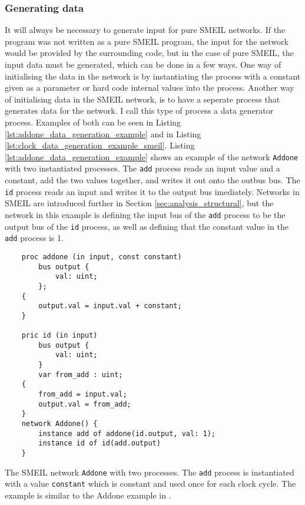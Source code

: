 \subsubsection{Generating data}
It will always be necessary to generate input for pure SMEIL networks. If the program was not written as a pure SMEIL program, the input for the network would be provided by the surrounding code, but in the case of pure SMEIL, the input data must be generated, which can be done in a few ways.
One way of initialising the data in the network is by instantiating the process with a constant given as a parameter or hard code internal values into the process. Another way of initialising data in the SMEIL network, is to have a seperate process that generates data for the network. I call this type of process a data generator process. Examples of both can be seen in Listing \ref{lst:addone_data_generation_example} and in Listing \ref{lst:clock_data_generation_example_smeil}.
Listing \ref{lst:addone_data_generation_example} shows an example of the network \texttt{Addone} with two instantiated processes. The \texttt{add} process reads an input value and a constant, add the two values together, and writes it out onto the outbus bus. The \texttt{id} process reads an input and writes it to the output bus imediately. Networks in SMEIL are introduced further in Section \ref{sec:analysis_structural}, but the network in this example is defining the input bus of the \texttt{add} process to be the output bus of the \texttt{id} process, as well as defining that the constant value in the \texttt{add} process is 1. \\
\begin{listing}
    \begin{verbatim}
    proc addone (in input, const constant)
        bus output {
            val: uint;
        };
    {
        output.val = input.val + constant;
    }

    pric id (in input)
        bus output {
            val: uint;
        }
        var from_add : uint;
    {
        from_add = input.val;
        output.val = from_add;
    }
    network Addone() {
        instance add of addone(id.output, val: 1);
        instance id of id(add.output)
    }
    \end{verbatim}
    \caption{The SMEIL network \texttt{Addone} with two processes. The \texttt{add} process is instantiated with a value \texttt{constant} which is constant and used once for each clock cycle. The example is similar to the Addone example in \cite{smeil}.}
    \label{lst:addone_data_generation_example}
\end{listing}

